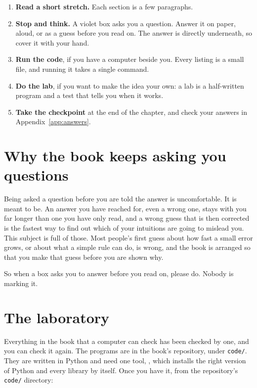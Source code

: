 \begin{enumerate}[leftmargin=1.6em, itemsep=3pt]
  \item \textbf{Read a short stretch.} Each section is a few paragraphs.
  \item \textbf{Stop and think.} A violet box asks you a question. Answer it
        \dash{} on paper, aloud, or as a guess \dash{} before you read on.
        The answer is directly underneath, so cover it with your hand.
  \item \textbf{Run the code}, if you have a computer beside you. Every
        listing is a small file, and running it takes a single command.
  \item \textbf{Do the lab}, if you want to make the idea your own: a lab is
        a half-written program and a test that tells you when it works.
  \item \textbf{Take the checkpoint} at the end of the chapter, and check
        your answers in Appendix~\ref{app:answers}.
\end{enumerate}

\section*{Why the book keeps asking you questions}

Being asked a question before you are told the answer is uncomfortable.
It is meant to be. An answer you have reached for, even a wrong one, stays
with you far longer than one you have only read, and a wrong guess that is
then corrected is the fastest way to find out which of your intuitions are
going to mislead you. This subject is full of those. Most people's first
guess about how fast a small error grows, or about what a simple rule can do,
is wrong, and the book is arranged so that you make that guess before you are
shown why.

So when a box asks you to answer before you read on, please do. Nobody is
marking it.

\section*{The laboratory}

Everything in the book that a computer can check has been checked by one,
and you can check it again. The programs are in the book's repository, under
\texttt{code/}. They are written in Python and need one tool, ,
which installs the right version of Python and every library by itself.
Once you have it, from the repository's \texttt{code/} directory:

